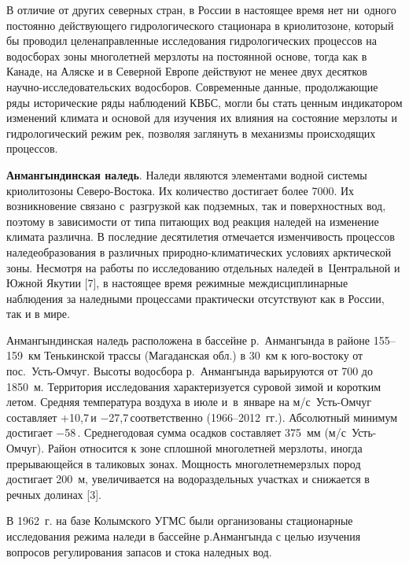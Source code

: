 В отличие от других северных стран, в России в настоящее время нет ни~одного постоянно действующего гидрологического стационара в криолитозоне, который бы проводил целенаправленные исследования гидрологических процессов на водосборах зоны многолетней мерзлоты на постоянной основе, тогда как в Канаде, на Аляске и в Северной Европе действуют не менее двух десятков научно-исследовательских водосборов. Современные данные, продолжающие ряды исторические ряды наблюдений КВБС, могли бы стать ценным индикатором изменений климата и основой для изучения их влияния на состояние мерзлоты и гидрологический режим рек, позволяя заглянуть в механизмы происходящих процессов.

\textbf{Анмангындинская наледь}. Наледи являются элементами водной системы криолитозоны Северо-Востока. Их количество достигает более 7000. Их возникновение связано с~разгрузкой как подземных, так и поверхностных вод, поэтому в зависимости от типа питающих вод реакция наледей на изменение климата различна. В последние десятилетия отмечается изменчивость процессов наледеобразования в различных природно-климатических условиях арктической зоны. Несмотря на работы по исследованию отдельных наледей в~Центральной и Южной Якутии [7], в настоящее время режимные междисциплинарные наблюдения за наледными процессами практически отсутствуют как в России, так и в мире.


Анмангындинская наледь расположена в бассейне р.~Анмангында в районе 155--159~км Тенькинской трассы (Магаданская обл.) в 30~км к юго-востоку от пос.~Усть-Омчуг. Высоты водосбора р.~Анмангында варьируются от 700 до 1850~м. Территория исследования характеризуется суровой зимой и коротким летом. Средняя температура воздуха в июле и~в~январе на м/с~Усть-Омчуг составляет +10,7\,\dgc  и $-$27,7\,\dgc соответственно (1966--2012~гг.). Абсолютный минимум достигает $-$58\,. Среднегодовая сумма осадков составляет 375~мм (м/с~Усть-Омчуг). Район относится к зоне сплошной многолетней мерзлоты, иногда прерывающейся в таликовых зонах. Мощность многолетнемерзлых пород достигает 200~м, увеличивается на водораздельных участках и снижается в речных долинах [3].

В 1962~г. на базе Колымского УГМС были организованы стационарные исследования режима наледи в бассейне р.Анмангында с целью изучения вопросов регулирования запасов и стока наледных вод.


